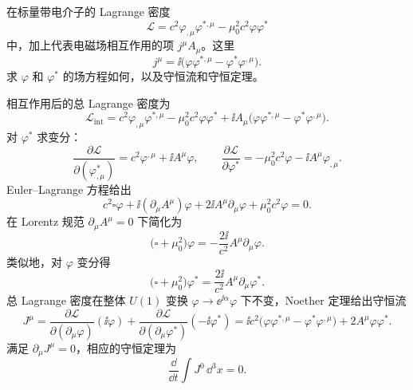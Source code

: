 \begin{question}
在标量带电介子的 Lagrange 密度
\[
\mathcal L=c^2\varphi_{,\mu}\varphi^{*,\mu}-\mu_0^2c^2\varphi\varphi^*
\]
中，加上代表电磁场相互作用的项 \(j^\mu A_\mu\)。这里
\[
j^\mu=\ii\bigl(\varphi\varphi^{*,\mu}-\varphi^{*}\varphi^{,\mu}\bigr).
\]
求 \(\varphi\) 和 \(\varphi^*\) 的场方程如何，以及守恒流和守恒定理。
\begin{solution}
相互作用后的总 Lagrange 密度为
\[
\mathcal L_{\text{int}} = c^2\varphi_{,\mu}\varphi^{*,\mu}
-\mu_0^2c^2\varphi\varphi^* + \ii A_\mu
\bigl(\varphi\varphi^{*,\mu}-\varphi^{*}\varphi^{,\mu}\bigr).
\]
对 \(\varphi^*\) 求变分：
\[
\frac{\partial\mathcal L}{\partial(\varphi^*_{,\mu})}=c^2\varphi^{,\mu}+\ii A^\mu\varphi,\qquad
\frac{\partial\mathcal L}{\partial\varphi^*}=-\mu_0^2c^2\varphi-\ii A^\mu\varphi_{,\mu}.
\]
Euler--Lagrange 方程给出
\[
c^2\square\varphi+\ii(\partial_\mu A^\mu)\varphi+2\ii A^\mu\partial_\mu\varphi
+\mu_0^2c^2\varphi=0 .
\]
在 Lorentz 规范 \(\partial_\mu A^\mu=0\) 下简化为
\[
\bigl(\square+\mu_0^2\bigr)\varphi = -\frac{2\ii}{c^2}A^\mu\partial_\mu\varphi .
\]
类似地，对 \(\varphi\) 变分得
\[
\bigl(\square+\mu_0^2\bigr)\varphi^* = \frac{2\ii}{c^2}A^\mu\partial_\mu\varphi^* .
\]
 总 Lagrange 密度在整体 \(U(1)\) 变换 \(\varphi\to \ee^{\ii\alpha}\varphi\) 下不变，Noether 定理给出守恒流
\[
J^\mu = \frac{\partial\mathcal L}{\partial(\partial_\mu\varphi)}(\ii\varphi)
+\frac{\partial\mathcal L}{\partial(\partial_\mu\varphi^*)}(-\ii\varphi^*)
= \ii c^2\bigl(\varphi\varphi^{*,\mu}-\varphi^{*}\varphi^{,\mu}\bigr)
+2A^\mu\varphi\varphi^* .
\]
满足 \(\partial_\mu J^\mu=0\)，相应的守恒定理为
\[
\frac{\dd}{\dd t}\int J^0\,\dd^3x = 0 .
\]
\end{solution}
\end{question}

